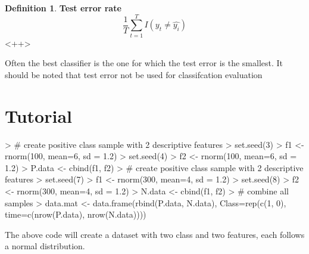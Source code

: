\documentclass[twoside]{article}
\theoremstyle{definition}
\theoremstyle{definition}
\newtheorem*{proof1}{Definition}
\newenvironment{ddef}{\begin{dBox}\begin{proof1}}{\hfill{\scriptsize}\end{proof1}\end{dBox}}
\begin{document}
\begin{ddef}
	\textbf{Test error rate}
	\begin{equation}
		\frac{1}{T} \sum^T_{t=1} I(y_t \neq \hat{y_i})
		\label{<+label+>}
	\end{equation}<++>
\end{ddef}

Often the best classifier is the one for which the test error is the smallest. It should be noted that test error not be used for classifcation evaluation

\section{Tutorial}
\begin{Schunk}
\begin{Sinput}
> # create positive class sample with 2 descriptive features
> set.seed(3)
> f1 <- rnorm(100, mean=6, sd = 1.2)
> set.seed(4)
> f2 <- rnorm(100, mean=6, sd = 1.2)
> P.data <- cbind(f1, f2)
> # create positive class sample with 2 descriptive features
> set.seed(7)
> f1 <- rnorm(300, mean=4, sd = 1.2)
> set.seed(8)
> f2 <- rnorm(300, mean=4, sd = 1.2)
> N.data <- cbind(f1, f2)
> # combine all samples
> data.mat <- data.frame(rbind(P.data, N.data), Class=rep(c(1, 0), time=c(nrow(P.data), nrow(N.data))))
\end{Sinput}
\end{Schunk}

The above code will create a dataset with two class and two features, each follows a normal distribution.
\end{document}
